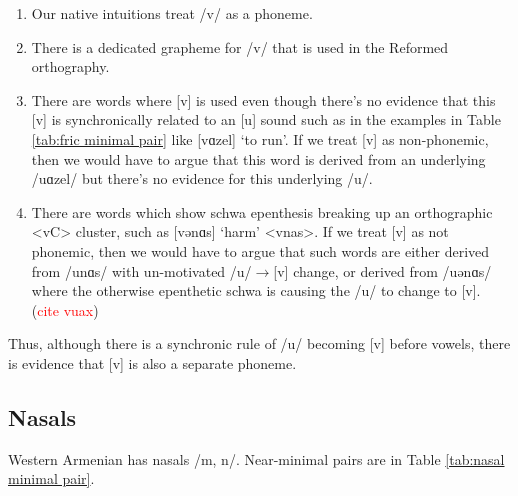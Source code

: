  \begin{enumerate}[noitemsep, topsep= 0pt]
  	\item Our native intuitions treat /v/ as a phoneme. 
  	\item There is a dedicated grapheme for /v/  that is used in the Reformed orthography.
  	\item There are words where [v] is used even though there's no evidence that this [v] is synchronically related to an [u] sound such as in the examples in Table \ref{tab:fric minimal pair} like [vɑzel] `to run'. If we treat [v] as non-phonemic, then we would have to argue that this word is derived from an underlying /uɑzel/ but there's no evidence for this underlying /u/. 
  	\item There are words which show schwa epenthesis breaking up an orthographic <vC> cluster, such as [vənɑs] `harm'  <vnas>. If we treat [v] as not phonemic, then we would have to argue that such words are either derived from /unɑs/ with un-motivated /u/$\rightarrow$[v] change, or derived from /uənɑs/ where the otherwise epenthetic schwa is causing the /u/ to change to [v]. (\textcolor{red}{cite vuax})
  \end{enumerate}
  
  Thus, although there is a synchronic rule of /u/ becoming [v] before vowels, there is evidence that [v] is also a separate phoneme. 
  
  \subsection{Nasals}\label{section:segmentalPhono:cons:nasal}
  Western Armenian has nasals /m, n/. Near-minimal pairs are in Table \ref{tab:nasal minimal pair}.
  
  
  
